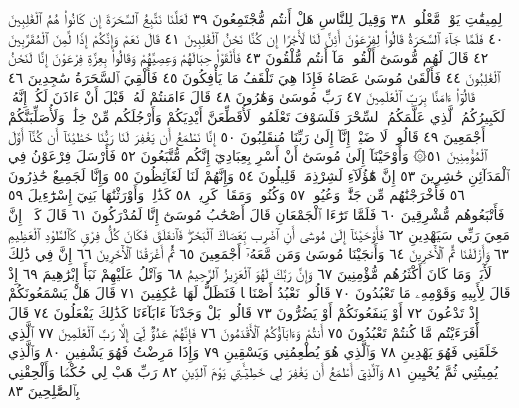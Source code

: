 لِمِيقَٰتِ يَوْمࣲ مَّعْلُومࣲ ٣٨ وَقِيلَ لِلنَّاسِ هَلْ أَنتُم مُّجْتَمِعُونَ ٣٩
لَعَلَّنَا نَتَّبِعُ ٱلسَّحَرَةَ إِن كَانُوا۟ هُمُ ٱلْغَٰلِبِينَ ٤٠ فَلَمَّا جَآءَ ٱلسَّحَرَةُ
قَالُوا۟ لِفِرْعَوْنَ أَئِنَّ لَنَا لَأَجْرًا إِن كُنَّا نَحْنُ ٱلْغَٰلِبِينَ ٤١ قَالَ نَعَمْ
وَإِنَّكُمْ إِذࣰا لَّمِنَ ٱلْمُقَرَّبِينَ ٤٢ قَالَ لَهُم مُّوسَىٰٓ أَلْقُوا۟ مَآ أَنتُم مُّلْقُونَ ٤٣
فَأَلْقَوْا۟ حِبَالَهُمْ وَعِصِيَّهُمْ وَقَالُوا۟ بِعِزَّةِ فِرْعَوْنَ إِنَّا لَنَحْنُ
ٱلْغَٰلِبُونَ ٤٤ فَأَلْقَىٰ مُوسَىٰ عَصَاهُ فَإِذَا هِيَ تَلْقَفُ مَا يَأْفِكُونَ ٤٥
فَأُلْقِيَ ٱلسَّحَرَةُ سَٰجِدِينَ ٤٦ قَالُوٓا۟ ءَامَنَّا بِرَبِّ ٱلْعَٰلَمِينَ ٤٧
رَبِّ مُوسَىٰ وَهَٰرُونَ ٤٨ قَالَ ءَامَنتُمْ لَهُۥ قَبْلَ أَنْ ءَاذَنَ لَكُمْۖ إِنَّهُۥ
لَكَبِيرُكُمُ ٱلَّذِي عَلَّمَكُمُ ٱلسِّحْرَ فَلَسَوْفَ تَعْلَمُونَۚ لَأُقَطِّعَنَّ أَيْدِيَكُمْ
وَأَرْجُلَكُم مِّنْ خِلَٰفࣲ وَلَأُصَلِّبَنَّكُمْ أَجْمَعِينَ ٤٩ قَالُوا۟ لَا ضَيْرَۖ إِنَّآ
إِلَىٰ رَبِّنَا مُنقَلِبُونَ ٥٠ إِنَّا نَطْمَعُ أَن يَغْفِرَ لَنَا رَبُّنَا خَطَٰيَٰنَآ أَن كُنَّآ
أَوَّلَ ٱلْمُؤْمِنِينَ ٥١۞ وَأَوْحَيْنَآ إِلَىٰ مُوسَىٰٓ أَنْ أَسْرِ بِعِبَادِيٓ إِنَّكُم
مُّتَّبَعُونَ ٥٢ فَأَرْسَلَ فِرْعَوْنُ فِي ٱلْمَدَآئِنِ حَٰشِرِينَ ٥٣ إِنَّ هَٰٓؤُلَآءِ
لَشِرْذِمَةࣱ قَلِيلُونَ ٥٤ وَإِنَّهُمْ لَنَا لَغَآئِظُونَ ٥٥ وَإِنَّا لَجَمِيعٌ حَٰذِرُونَ ٥٦
فَأَخْرَجْنَٰهُم مِّن جَنَّٰتࣲ وَعُيُونࣲ ٥٧ وَكُنُوزࣲ وَمَقَامࣲ كَرِيمࣲ ٥٨
كَذَٰلِكَۖ وَأَوْرَثْنَٰهَا بَنِيٓ إِسْرَٰٓءِيلَ ٥٩ فَأَتْبَعُوهُم مُّشْرِقِينَ ٦٠
فَلَمَّا تَرَٰٓءَا ٱلْجَمْعَانِ قَالَ أَصْحَٰبُ مُوسَىٰٓ إِنَّا لَمُدْرَكُونَ ٦١
قَالَ كَلَّآۖ إِنَّ مَعِيَ رَبِّي سَيَهْدِينِ ٦٢ فَأَوْحَيْنَآ إِلَىٰ مُوسَىٰٓ أَنِ
ٱضْرِب بِّعَصَاكَ ٱلْبَحْرَۖ فَٱنفَلَقَ فَكَانَ كُلُّ فِرْقࣲ كَٱلطَّوْدِ ٱلْعَظِيمِ ٦٣
وَأَزْلَفْنَا ثَمَّ ٱلْأٓخَرِينَ ٦٤ وَأَنجَيْنَا مُوسَىٰ وَمَن مَّعَهُۥٓ أَجْمَعِينَ ٦٥
ثُمَّ أَغْرَقْنَا ٱلْأٓخَرِينَ ٦٦ إِنَّ فِي ذَٰلِكَ لَأٓيَةࣰۖ وَمَا كَانَ
أَكْثَرُهُم مُّؤْمِنِينَ ٦٧ وَإِنَّ رَبَّكَ لَهُوَ ٱلْعَزِيزُ ٱلرَّحِيمُ ٦٨
وَٱتْلُ عَلَيْهِمْ نَبَأَ إِبْرَٰهِيمَ ٦٩ إِذْ قَالَ لِأَبِيهِ وَقَوْمِهِۦ مَا تَعْبُدُونَ ٧٠
قَالُوا۟ نَعْبُدُ أَصْنَامࣰا فَنَظَلُّ لَهَا عَٰكِفِينَ ٧١ قَالَ هَلْ
يَسْمَعُونَكُمْ إِذْ تَدْعُونَ ٧٢ أَوْ يَنفَعُونَكُمْ أَوْ يَضُرُّونَ ٧٣ قَالُوا۟
بَلْ وَجَدْنَآ ءَابَآءَنَا كَذَٰلِكَ يَفْعَلُونَ ٧٤ قَالَ أَفَرَءَيْتُم مَّا كُنتُمْ
تَعْبُدُونَ ٧٥ أَنتُمْ وَءَابَآؤُكُمُ ٱلْأَقْدَمُونَ ٧٦ فَإِنَّهُمْ عَدُوࣱّ لِّيٓ
إِلَّا رَبَّ ٱلْعَٰلَمِينَ ٧٧ ٱلَّذِي خَلَقَنِي فَهُوَ يَهْدِينِ ٧٨ وَٱلَّذِي هُوَ
يُطْعِمُنِي وَيَسْقِينِ ٧٩ وَإِذَا مَرِضْتُ فَهُوَ يَشْفِينِ ٨٠ وَٱلَّذِي
يُمِيتُنِي ثُمَّ يُحْيِينِ ٨١ وَٱلَّذِيٓ أَطْمَعُ أَن يَغْفِرَ لِي خَطِيٓـَٔتِي
يَوْمَ ٱلدِّينِ ٨٢ رَبِّ هَبْ لِي حُكْمࣰا وَأَلْحِقْنِي بِٱلصَّٰلِحِينَ ٨٣
